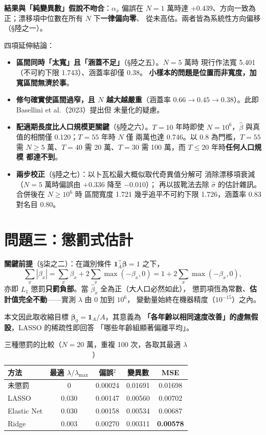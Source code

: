 \documentclass[UTF8, fontset=macnew, a4paper, 12pt]{ctexart}
\begin{document}
\textbf{結果與「純變異數」假說不吻合}：$\alpha_x$ 偏誤在 $N=1$ 萬時達
$+0.439$、方向一致為正；漂移項中位數在所有 $N$ 下\textbf{一律偏向零}、
從未高估。兩者皆為系統性方向偏移（\S 陸之一）。

四項延伸結論：

\begin{itemize}[leftmargin=*]
  \item \textbf{區間同時「太寬」且「涵蓋不足」}（\S 陸之五）。$N=5$ 萬時
        現行作法寬 5.401（不可約下限 1.743）、涵蓋率卻僅 0.38。
        \textbf{小樣本的問題是位置而非寬度，加寬區間無濟於事}。
  \item \textbf{修勻確實使區間過窄，且 $N$ 越大越嚴重}（涵蓋率
        $0.66\to0.45\to0.38$）。此即 Basellini et al.（2023）提出但
        未量化的疑慮。
  \item \textbf{配適期長度比人口規模更關鍵}（\S 陸之六）。$T=10$ 年時即使
        $N=10^6$，$\hat\beta$ 與真值的相關僅 0.120；$T=55$ 年時 $N$ 僅
        兩萬也達 0.746。以 0.8 為門檻，$T{=}55$ 需 $N\ge5$ 萬、$T{=}40$ 需
        20 萬、$T{=}30$ 需 100 萬，而 $T\le20$ 年時\textbf{任何人口規模
        都達不到}。
  \item \textbf{兩步校正}（\S 陸之七）：以卜瓦松最大概似取代奇異值分解可
        消除漂移項衰減（$N=5$ 萬時偏誤由 $+0.336$ 降至 $-0.010$）；
        再以拔靴法去除 $\hat\sigma$ 的估計雜訊。合併後在 $N\ge10^6$ 時
        區間寬度 1.721 幾乎追平不可約下限 1.726，涵蓋率 0.83 對名目 0.80。
\end{itemize}

\section{問題三：懲罰式估計}

\textbf{關鍵前提}（\S 柒之二）：在識別條件 $\mathbf{1}_A^{\!\top}
\boldsymbol{\beta}=1$ 之下，
\[
\textstyle\sum_x|\beta_x|=\sum_x\beta_x+2\sum_x\max(-\beta_x,0)
=1+2\sum_x\max(-\beta_x,0),
\]
亦即 $L_1$ 懲罰\textbf{只罰負部}。當 $\hat\beta_x$ 全為正（大人口必然如此），
懲罰項恆為常數、\textbf{估計值完全不動}——實測 $\lambda$ 由 0 加到 $10^6$，
變動量始終在機器精度（$10^{-15}$）之內。

本文因此取收縮目標 $\boldsymbol{\beta}_0=\mathbf{1}_A/A$，其意義為
\textbf{「各年齡以相同速度改善」的虛無假設}，LASSO 的稀疏性即回答
「哪些年齡組顯著偏離平均」。

\begin{table}[H]
\centering
\caption{三種懲罰的比較（$N=20$ 萬，重複 100 次，各取其最適 $\lambda$）}
\small
\begin{tabular}{lcccc}
\toprule
方法 & 最適 $\lambda/\lambda_{\max}$ & 偏誤$^2$ & 變異數 & MSE\\
\midrule
未懲罰 & 0 & 0.00024 & 0.01691 & 0.01698\\
LASSO & 0.030 & 0.00147 & 0.00560 & 0.00702\\
Elastic Net & 0.030 & 0.00158 & 0.00534 & 0.00687\\
Ridge & 0.003 & 0.00270 & 0.00311 & \textbf{0.00578}\\
\bottomrule
\end{tabular}
\end{table}
\end{document}
